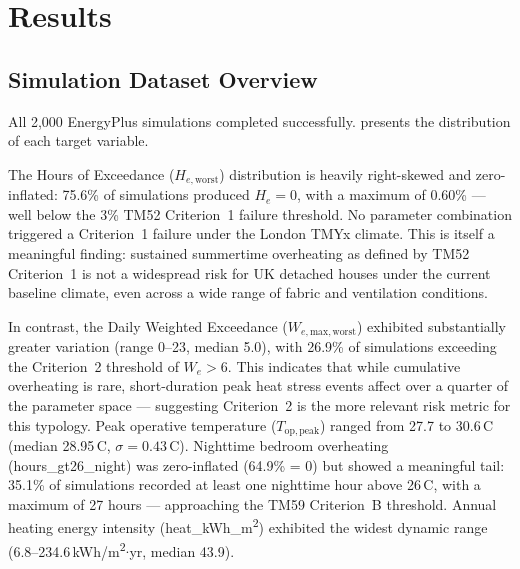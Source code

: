 \documentclass[12pt,a4paper]{report}
\begin{document}
\chapter{Results}
\label{ch:results}


\section{Simulation Dataset Overview}
\label{sec:dataset-overview}

All 2{,}000 EnergyPlus simulations completed successfully.  presents the distribution of each target variable.

The Hours of Exceedance ($H_{e,\mathrm{worst}}$) distribution is heavily right-skewed and zero-inflated: 75.6\% of simulations produced $H_e = 0$, with a maximum of 0.60\% --- well below the 3\% TM52 Criterion~1 failure threshold. No parameter combination triggered a Criterion~1 failure under the London TMYx climate. This is itself a meaningful finding: sustained summertime overheating as defined by TM52 Criterion~1 is not a widespread risk for UK detached houses under the current baseline climate, even across a wide range of fabric and ventilation conditions.

In contrast, the Daily Weighted Exceedance ($W_{e,\mathrm{max,worst}}$) exhibited substantially greater variation (range 0--23, median 5.0), with 26.9\% of simulations exceeding the Criterion~2 threshold of $W_e > 6$. This indicates that while cumulative overheating is rare, short-duration peak heat stress events affect over a quarter of the parameter space --- suggesting Criterion~2 is the more relevant risk metric for this typology. Peak operative temperature ($T_{\mathrm{op,peak}}$) ranged from 27.7 to 30.6\,\textdegree C (median 28.95\,\textdegree C, $\sigma = 0.43$\,\textdegree C). Nighttime bedroom overheating (hours\_gt26\_night) was zero-inflated (64.9\% = 0) but showed a meaningful tail: 35.1\% of simulations recorded at least one nighttime hour above 26\,\textdegree C, with a maximum of 27 hours --- approaching the TM59 Criterion~B threshold. Annual heating energy intensity (heat\_kWh\_m\textsuperscript{2}) exhibited the widest dynamic range (6.8--234.6\,kWh/m\textsuperscript{2}$\cdot$yr, median 43.9).
\end{document}
